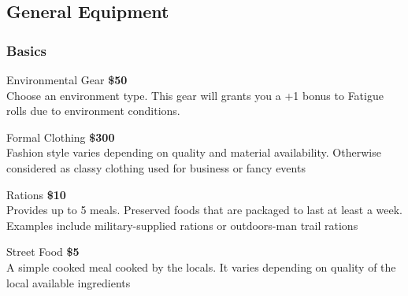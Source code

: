 \subsection{General Equipment}

\begin{multicols}{2}

\subsubsection{Basics}

\begin{genericsection}{Environmental Gear}
\textbf{\$50}\\
Choose an environment type. This gear will grants you a +1 bonus to Fatigue rolls due to environment conditions.
\end{genericsection}

\begin{genericsection}{Formal Clothing}
\textbf{\$300}\\
Fashion style varies depending on quality and material availability. Otherwise considered as classy clothing used for business or fancy events
\end{genericsection}

\begin{genericsection}{Rations}
\textbf{\$10}\\
Provides up to 5 meals. Preserved foods that are packaged to last at least a week. Examples include military-supplied rations or outdoors-man trail rations
\end{genericsection}

\begin{genericsection}{Street Food}
\textbf{\$5}\\
A simple cooked meal cooked by the locals. It varies depending on quality of the local available ingredients
\end{genericsection}



\end{multicols}
